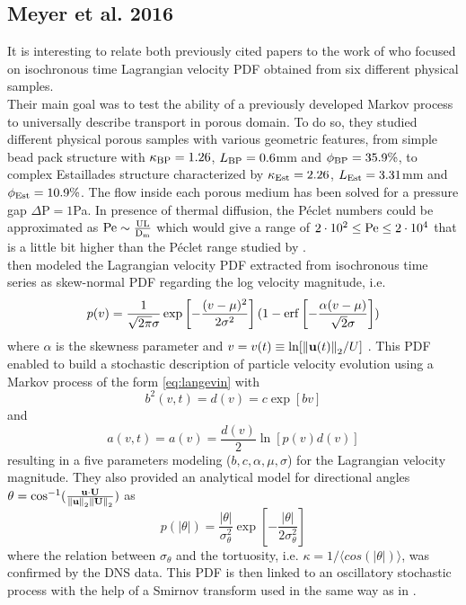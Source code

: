 \subsection{Meyer et al. 2016}
It is interesting to relate both previously cited papers to the work of \citet{Meyer2016} who focused on isochronous time Lagrangian velocity PDF obtained from six different physical samples. \\
Their main goal was to test the ability of a previously developed Markov process to universally describe transport in porous domain.
To do so, they studied different physical porous samples with various geometric features, from simple bead pack structure with $\kappa_{\rm{BP}} = 1.26$, $L_{\rm{BP}}=0.6$mm and $\phi_{\rm{BP}}=35.9\%$, to complex Estaillades structure characterized by $\kappa_{\rm{Est}} = 2.26$, $L_{\rm{Est}}=3.31$mm and $\phi_{\rm{Est}}=10.9\%$.
The flow inside each porous medium has been solved for a pressure gap $\Delta\textrm{P}=1$Pa. 
In presence of thermal diffusion, the Péclet numbers could be approximated as $\rm{Pe}\sim\frac{UL}{D_m}$ which would give a range of $2\cdot10^2\leq\rm{Pe}\leq2\cdot10^4$ that is a little bit higher than the Péclet range studied by \citet{Dentz2017}.\\
\citeauthor{Meyer2016} then modeled the Lagrangian velocity PDF extracted from isochronous time series as skew-normal PDF regarding the log velocity magnitude, i.e.
\begin{equation}\label{eq:meyer_skew}
p(v)=\frac{1}{\sqrt{2\pi}\sigma}\exp\left[-\frac{(v-\mu)^2}{2\sigma^2}\right](1-\erf\left[-\frac{\alpha(v-\mu)}{\sqrt{2}\sigma}\right])
\end{equation}
where $\alpha$ is the skewness parameter and $v=v(t)\equiv\ln[\norm{\textbf{u}(t)}_2/U]$ . This PDF enabled to build a stochastic description of particle velocity evolution using a Markov process of the form \eqref{eq:langevin} with 
\[b^2(v,t)=d(v)=c\exp[bv]\]
and 
\[a(v,t)=a(v)=\frac{d(v)}{2}\ln[p(v)d(v)]\]
resulting in a five parameters modeling ($b,c,\alpha,\mu,\sigma$) for the Lagrangian velocity magnitude.
They also provided an analytical model for directional angles $\theta=\cos^{-1}(\frac{\textbf{u}\cdot\textbf{U}}{\norm{\textbf{u}}_2\norm{\textbf{U}}_2})$ as
\[p(|\theta|)=\frac{|\theta|}{\sigma_\theta^2}\exp\left[-\frac{|\theta|}{2\sigma_\theta^2}\right]\]
where the relation between $\sigma_\theta$ and the tortuosity, i.e. $\kappa=1/\langle cos(|\theta|)\rangle$, was confirmed by the DNS data. This PDF is then linked to an oscillatory stochastic process with the help of a Smirnov transform used in the same way as in \citet{Puyguiraud2019}. \\
